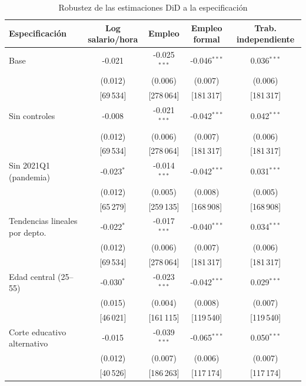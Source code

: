 \begin{table}[!tbp]\centering
\caption{Robustez de las estimaciones DiD a la especificación}\label{tab:robspec}
\begin{threeparttable}
\footnotesize
\setlength{\tabcolsep}{4pt}
\begin{tabular}{lcccc}
\toprule
Especificación & Log salario/hora & Empleo & Empleo formal & Trab. independiente \\
\midrule
Base & -0.021 & -0.025$^{***}$ & -0.046$^{***}$ & 0.036$^{***}$ \\
 & (0.012) & (0.006) & (0.007) & (0.006) \\
 & \footnotesize[69\,534] & \footnotesize[278\,064] & \footnotesize[181\,317] & \footnotesize[181\,317] \\
Sin controles & -0.008 & -0.021$^{***}$ & -0.042$^{***}$ & 0.042$^{***}$ \\
 & (0.012) & (0.006) & (0.007) & (0.006) \\
 & \footnotesize[69\,534] & \footnotesize[278\,064] & \footnotesize[181\,317] & \footnotesize[181\,317] \\
Sin 2021Q1 (pandemia) & -0.023$^{*}$ & -0.014$^{***}$ & -0.042$^{***}$ & 0.031$^{***}$ \\
 & (0.012) & (0.005) & (0.008) & (0.005) \\
 & \footnotesize[65\,279] & \footnotesize[259\,135] & \footnotesize[168\,908] & \footnotesize[168\,908] \\
Tendencias lineales por depto. & -0.022$^{*}$ & -0.017$^{***}$ & -0.040$^{***}$ & 0.034$^{***}$ \\
 & (0.012) & (0.006) & (0.007) & (0.006) \\
 & \footnotesize[69\,534] & \footnotesize[278\,064] & \footnotesize[181\,317] & \footnotesize[181\,317] \\
Edad central (25--55) & -0.030$^{*}$ & -0.023$^{***}$ & -0.042$^{***}$ & 0.029$^{***}$ \\
 & (0.015) & (0.004) & (0.008) & (0.007) \\
 & \footnotesize[46\,021] & \footnotesize[161\,115] & \footnotesize[119\,540] & \footnotesize[119\,540] \\
Corte educativo alternativo & -0.015 & -0.039$^{***}$ & -0.065$^{***}$ & 0.050$^{***}$ \\
 & (0.012) & (0.007) & (0.006) & (0.007) \\
 & \footnotesize[40\,526] & \footnotesize[186\,263] & \footnotesize[117\,174] & \footnotesize[117\,174] \\

\end{tabular}
\end{threeparttable}
\end{table}
